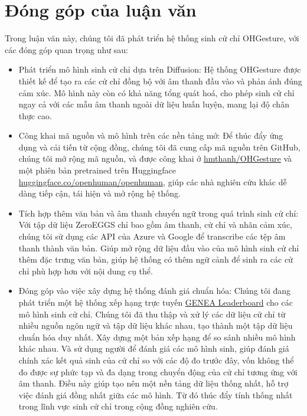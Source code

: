 


\section{Đóng góp của luận văn}

Trong luận văn này, chúng tôi đã phát triển hệ thống sinh cử chỉ OHGesture, với các đóng góp quan trọng như sau:

\begin{itemize}
	\item Phát triển mô hình sinh cử chỉ dựa trên Diffusion: Hệ thống OHGesture được thiết kế để tạo ra các cử chỉ đồng bộ với âm thanh đầu vào và phản ánh đúng cảm xúc. Mô hình này còn có khả năng tổng quát hoá, cho phép sinh cử chỉ ngay cả với các mẫu âm thanh ngoài dữ liệu huấn luyện, mang lại độ chân thực cao.
	
	\item Công khai mã nguồn và mô hình trên các nền tảng mở: Để thúc đẩy ứng dụng và cải tiến từ cộng đồng, chúng tôi đã cung cấp mã nguồn trên GitHub, chúng tôi mở rộng mã nguồn, và được công khai ở \hyperlink{https://github.com/hmthanh/OHGesture}{hmthanh/OHGesture} và một phiên bản pretrained trên Huggingface \hyperlink{https://huggingface.co/openhuman/openhuman}{huggingface.co/openhuman/openhuman}, giúp các nhà nghiên cứu khác dễ dàng tiếp cận, tái hiện và mở rộng hệ thống.
	
	\item Tích hợp thêm văn bản và âm thanh chuyển ngữ trong quá trình sinh cử chỉ: Với tập dữ liệu ZeroEGGS chỉ bao gồm âm thanh, cử chỉ và nhãn cảm xúc, chúng tôi sử dụng các API của Azure và Google để transcribe các tệp âm thanh thành văn bản. Giúp mở rộng dữ liệu đầu vào của mô hình sinh cử chỉ thêm đặc trưng văn bản, giúp hệ thống có thêm ngữ cảnh để sinh ra các cử chỉ phù hợp hơn với nội dung cụ thể.
	
	\item Đóng góp vào việc xây dựng hệ thống đánh giá chuẩn hóa: Chúng tôi đang phát triển một hệ thống xếp hạng trực tuyến \hyperlink{https://genea-workshop.github.io/leaderboard/}{GENEA Leaderboard} \cite{nagy2024towards} cho các mô hình sinh cử chỉ. Chúng tôi đã thu thập và xử lý các dữ liệu cử chỉ từ nhiều nguồn ngôn ngữ và tập dữ liệu khác nhau, tạo thành một tập dữ liệu chuẩn hóa duy nhất. Xây dựng một bản xếp hạng để so sánh nhiều mô hình khác nhau. Và sử dụng người để đánh giá các mô hình sinh, giúp đánh giá chính xác kết quả sinh của cử chỉ so với các độ đo trước đây, vốn không thể đo được sự phức tạp và đa dạng trong chuyển động của cử chỉ tương ứng với âm thanh. Điều này giúp tạo nên một nền tảng dữ liệu thống nhất, hỗ trợ việc đánh giá đồng nhất giữa các mô hình. Từ đó thúc đẩy tính thống nhất trong lĩnh vực sinh cử chỉ trong cộng đồng nghiên cứu.
	

\end{itemize}
